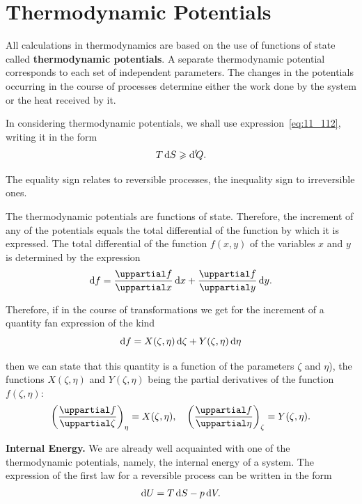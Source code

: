 \section{Thermodynamic Potentials}\label{sec:12_6}

All calculations in thermodynamics are based on the use of functions of state called \textbf{thermodynamic potentials}. A separate thermodynamic potential corresponds to each set of independent parameters. The changes in the potentials occurring in the course of processes determine either the work done by the system or the heat received by it.

In considering thermodynamic potentials, we shall use expression~\eqref{eq:11_112}, writing it in the form
\begin{equation}\label{eq:12_46}
	T\,\mathrm{d} S \geqslant \mathrm{d}'\!Q.
\end{equation}

\noindent
The equality sign relates to reversible processes, the inequality sign to irreversible ones.

The thermodynamic potentials are functions of state. Therefore, the increment of any of the potentials equals the total differential of the function by which it is expressed. The total differential of the function $f(x, y)$ of the variables $x$ and $y$ is determined by the expression
\begin{equation*}
	\deriv{f} = \diffpartial{f}{x}\,\deriv{x} + \diffpartial{f}{y}\,\deriv{y}.
\end{equation*}

\noindent
Therefore, if in the course of transformations we get for the increment of a quantity fan expression of the kind
\begin{equation}\label{eq:12_47}
	\mathrm{d} f = X(\zeta,\eta)\,\mathrm{d}\zeta + Y(\zeta,\eta)\,\mathrm{d}\eta
\end{equation}

\noindent
then we can state that this quantity is a function of the parameters $\zeta$ and $\eta$), the functions $X(\zeta,\eta)$ and $Y(\zeta,\eta)$ being the partial derivatives of the function $f(\zeta,\eta)$:
\begin{equation}\label{eq:12_48}
	\parenthesis{\diffpartial{f}{\zeta}}_{\eta} = X(\zeta,\eta),\quad \parenthesis{\diffpartial{f}{\eta}}_{\zeta} = Y(\zeta,\eta).
\end{equation}

\textbf{Internal Energy.} We are already well acquainted with one of the thermodynamic potentials, namely, the internal energy of a system. The expression of the first law for a reversible process can be written in the form
\begin{equation}\label{eq:12_49}
	\mathrm{d} U = T\,\mathrm{d} S - p\,\mathrm{d} V.
\end{equation}

